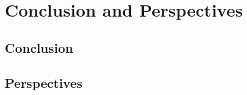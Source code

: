 
\chapter{Conclusion and Perspectives}

\section{Conclusion}

\lipsum[1-2]

\section{Perspectives}

\lipsum[3]
